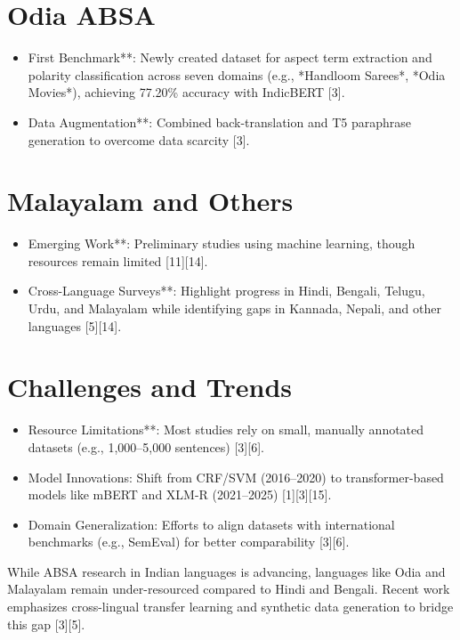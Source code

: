 \documentclass{article}
\begin{document}
\section{Odia ABSA}
\begin{itemize}
\item First Benchmark**: Newly created dataset for aspect term extraction and polarity classification across seven domains (e.g., *Handloom Sarees*, *Odia Movies*), achieving 77.20\% accuracy with IndicBERT [3].
\item Data Augmentation**: Combined back-translation and T5 paraphrase generation to overcome data scarcity [3].
\end{itemize}

\section{Malayalam and Others}
\begin{itemize}
\item Emerging Work**: Preliminary studies using machine learning, though resources remain limited [11][14].
\item Cross-Language Surveys**: Highlight progress in Hindi, Bengali, Telugu, Urdu, and Malayalam while identifying gaps in Kannada, Nepali, and other languages [5][14].

\end{itemize}
\section{Challenges and Trends}
\begin{itemize}
\item Resource Limitations**: Most studies rely on small, manually annotated datasets (e.g., 1,000–5,000 sentences) [3][6].
\item Model Innovations: Shift from CRF/SVM (2016–2020) to transformer-based models like mBERT and XLM-R (2021–2025) [1][3][15].
\item Domain Generalization: Efforts to align datasets with international benchmarks (e.g., SemEval) for better comparability [3][6].

\end{itemize}
While ABSA research in Indian languages is advancing, languages like Odia and Malayalam remain under-resourced compared to Hindi and Bengali. Recent work emphasizes cross-lingual transfer learning and synthetic data generation to bridge this gap [3][5].
\end{document}
